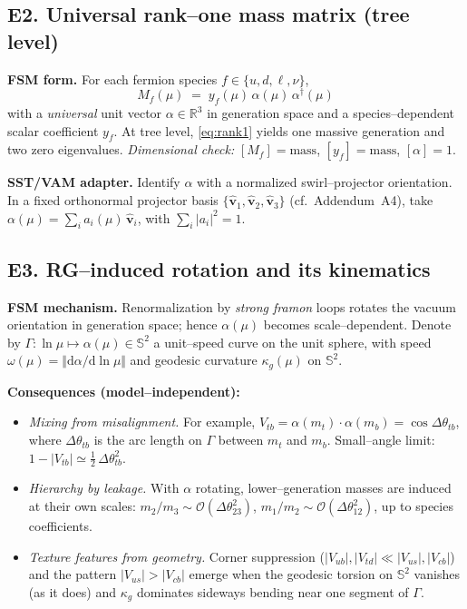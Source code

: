 \documentclass[11pt]{article}
\begin{document}
      \subsection*{E2. Universal rank–one mass matrix (tree level)}
          \textbf{FSM form.} For each fermion species $f\in\{u,d,\ell,\nu\}$,
          \begin{equation}
          \boxed{\quad M_f(\mu)\;=\; y_f(\mu)\,\alpha(\mu)\,\alpha^{\dagger}(\mu)\quad}
          \label{eq:rank1}
          \end{equation}
          with a \emph{universal} unit vector $\alpha\in\mathbb R^3$ in generation space and a species–dependent scalar coefficient $y_f$.
          At tree level, \eqref{eq:rank1} yields one massive generation and two zero eigenvalues.
          \textit{Dimensional check:} $[M_f]=\mathrm{mass}$, $[y_f]=\mathrm{mass}$, $[\alpha]=1$.

          \textbf{SST/VAM adapter.} Identify $\alpha$ with a normalized swirl–projector orientation. In a fixed orthonormal projector basis $\{\hat{\mathbf v}_1,\hat{\mathbf v}_2,\hat{\mathbf v}_3\}$ (cf.\ Addendum~A4), take
          $\alpha(\mu)=\sum_i a_i(\mu)\,\hat{\mathbf v}_i$, with $\sum_i |a_i|^2=1$.

      \subsection*{E3. RG–induced rotation and its kinematics}
          \textbf{FSM mechanism.} Renormalization by \emph{strong framon} loops rotates the vacuum orientation in generation space; hence $\alpha(\mu)$ becomes scale–dependent. Denote by
          $\Gamma:\ln\mu\mapsto \alpha(\mu)\in\mathbb S^2$ a unit–speed curve on the unit sphere, with speed
          $\omega(\mu)=\bigl\Vert\mathrm d\alpha/\mathrm d\ln\mu\bigr\Vert$ and geodesic curvature $\kappa_g(\mu)$ on $\mathbb S^2$.

          \textbf{Consequences (model–independent):}
          \begin{itemize}
          \item \emph{Mixing from misalignment.} For example,
          $V_{tb}=\alpha(m_t)\!\cdot\!\alpha(m_b)=\cos\Delta\theta_{tb}$, where $\Delta\theta_{tb}$ is the arc length on $\Gamma$ between $m_t$ and $m_b$. Small–angle limit:
          $1-|V_{tb}|\simeq \tfrac12\,\Delta\theta_{tb}^2$.
          \item \emph{Hierarchy by leakage.} With $\alpha$ rotating, lower–generation masses are induced at their own scales:
          $m_2/m_3\sim\mathcal O(\Delta\theta_{23}^2)$, $m_1/m_2\sim\mathcal O(\Delta\theta_{12}^2)$, up to species coefficients.
          \item \emph{Texture features from geometry.} Corner suppression ($|V_{ub}|,|V_{td}|\ll|V_{us}|,|V_{cb}|$) and the pattern $|V_{us}|>|V_{cb}|$ emerge when the geodesic torsion on $\mathbb S^2$ vanishes (as it does) and $\kappa_g$ dominates sideways bending near one segment of $\Gamma$.
          \end{itemize}
\end{document}
